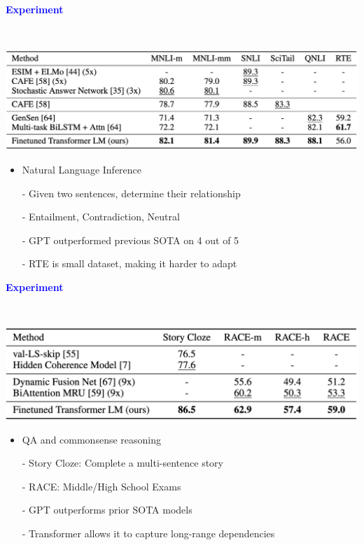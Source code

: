 \documentclass[professionalfont]{beamer}
\begin{document}
\begin{frame}
\begin{center}
    { \textbf{\textcolor{blue}{ {\fontsize{12}{14}\selectfont Experiment} }} }
\end{center}
\\[0.3cm]
\begin{center}
    \includegraphics[width=1.0\textwidth]{table/2.png}
\end{center}

{\fontsize{10}{14}\selectfont 
\begin{itemize}
    \item Natural Language Inference
    
    - Given two sentences, determine their relationship

    - Entailment, Contradiction, Neutral

    - GPT outperformed previous SOTA on 4 out of 5

    - RTE is small dataset, making it harder to adapt

\end{itemize}
}

\end{frame}

\begin{frame}
\begin{center}
    { \textbf{\textcolor{blue}{ {\fontsize{12}{14}\selectfont Experiment} }} }
\end{center}
\\[0.3cm]
\begin{center}
    \includegraphics[width=1.0\textwidth]{table/3.png}
\end{center}

{\fontsize{10}{14}\selectfont 
\begin{itemize}
    \item QA and commonsense reasoning

    - Story Cloze: Complete a multi-sentence story

    - RACE: Middle/High School Exams
    
    - GPT outperforms prior SOTA models

    - Transformer allows it to capture long-range dependencies
\end{itemize}
}

\end{frame}
\end{document}
